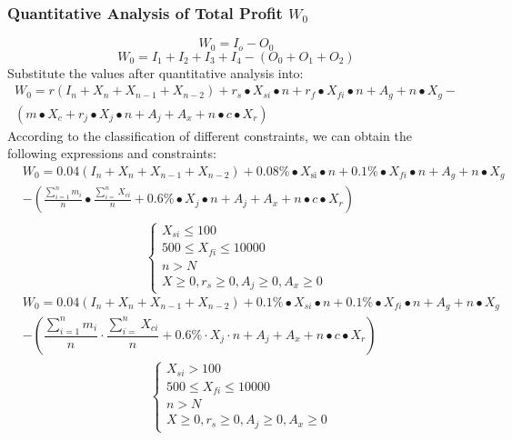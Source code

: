 \documentclass[../mcmpaper]{subfiles}
\begin{document}
\subsubsection{Quantitative Analysis of Total Profit $W_0$}
\begin{equation}
W_0=I_o - O_0
\end{equation}
\begin{equation}
W_0=I_1+I_{2}+I_3+I_4-(O_0+O_1+O_2)
\end{equation}
Substitute the values after quantitative analysis into:
\begin{equation}
\begin{gathered}
W_{0}=r\left(I_{n}+X_{n}+X_{n-1}+X_{n-2}\right)+r_{s} \bullet X_{s i} \bullet n+r_{f} \bullet X_{f i} \bullet n+A_{g}+n \bullet X_{g}- \\
\left(m \bullet X_{c}+r_{j} \bullet X_{j} \bullet n+A_{j}+A_{x}+n \bullet c \bullet X_{r}\right)
\end{gathered}
\end{equation}
According to the classification of different constraints, we can obtain the following expressions and constraints:
\begin{equation}
\begin{aligned}
&W_{0}=0.04\left(I_{n}+X_{n}+X_{n-1}+X_{n-2}\right)+0.08 \% \bullet X_{\mathrm{si}} \bullet n+0.1 \% \bullet X_{f i} \bullet n+A_{g}+n \bullet X_{g} \\
&-\left(\frac{\sum_{i=1}^{n} m_{i}}{n} \bullet \frac{\sum_{i=}^{n} X_{c i}}{n}+0.6 \% \bullet X_{j} \bullet n+A_{j}+A_{x}+n \bullet c \bullet X_{r}\right)\\
\end{aligned}
\end{equation}
\begin{equation}
\left\{\begin{array}{l}
X_{s i} \leq 100 \\
500 \leq X_{f i} \leq 10000 \\
n>N \\
X \geq 0, r_{s} \geq 0, A_{j} \geq 0, A_{x} \geq 0
\end{array}\right.
\end{equation}
\begin{equation}
\begin{aligned}
&W_{0}=0.04\left(I_{n}+X_{n}+X_{n-1}+X_{n-2}\right)+0.1 \% \bullet X_{s i} \bullet n+0.1 \% \bullet X_{f i} \bullet n+A_{g}+n \bullet X_{g} \\
&-\left(\dfrac{\sum_{i=1}^{n} m_{i}}{n} \cdot \dfrac{\sum_{i=}^{n} X_{c i}}{n}+0.6 \% \cdot X_{j} \cdot n+A_{j}+A_{x}+n \bullet c \bullet X_{r}\right) \\
&\hspace{10em}\left\{\begin{array}{l}
X_{s i}>100 \\
500 \leq X_{f i} \leq 10000 \\
n>N \\
X \geq 0, r_{s} \geq 0, A_{j} \geq 0, A_{x} \geq 0
\end{array}\right.
\end{aligned}
\end{equation}
\end{document}
